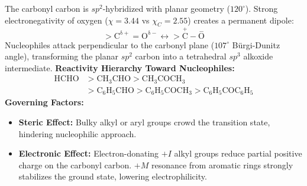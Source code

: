 \documentclass[10pt,twoside,openright]{book}
\begin{document}
\begin{conceptbox}
The carbonyl carbon is $sp^2$-hybridized with planar geometry ($120^\circ$). Strong electronegativity of oxygen ($\chi=3.44$ vs $\chi_C=2.55$) creates a permanent dipole:
\begin{equation}
  >\mathrm{C^{\delta+}=O^{\delta-}} \longleftrightarrow >\mathrm{\overset{+}{C}-\overset{-}{O}}
\end{equation}
Nucleophiles attack perpendicular to the carbonyl plane ($107^\circ$ Bürgi-Dunitz angle), transforming the planar $sp^2$ carbon into a tetrahedral $sp^3$ alkoxide intermediate.
\textbf{Reactivity Hierarchy Toward Nucleophiles:}
\begin{align}
  \mathrm{HCHO} &> \mathrm{CH_3CHO} > \mathrm{CH_3COCH_3} \\
  &> \mathrm{C_6H_5CHO} > \mathrm{C_6H_5COCH_3} > \mathrm{C_6H_5COC_6H_5}
\end{align}
\textbf{Governing Factors:}
\begin{itemize}
  \item \textbf{Steric Effect:} Bulky alkyl or aryl groups crowd the transition state, hindering nucleophilic approach.
  \item \textbf{Electronic Effect:} Electron-donating $+I$ alkyl groups reduce partial positive charge on the carbonyl carbon. $+M$ resonance from aromatic rings strongly stabilizes the ground state, lowering electrophilicity.
\end{itemize}
\end{conceptbox}
\end{document}
